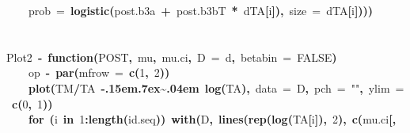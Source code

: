 \documentclass{article}
\makeatletter
\newcommand{\hlnumber}[1]{\textcolor[rgb]{0,0,0}{#1}}%
\newcommand{\hlfunctioncall}[1]{\textcolor[rgb]{.5,0,.33}{\textbf{#1}}}%
\newcommand{\hlstring}[1]{\textcolor[rgb]{.6,.6,1}{#1}}%
\newcommand{\hlkeyword}[1]{\textbf{#1}}%
\newcommand{\hlargument}[1]{\textcolor[rgb]{.69,.25,.02}{#1}}%
\newcommand{\hlformalargs}[1]{\hlargument{#1}}%
\newcommand{\hleqformalargs}[1]{\hlargument{#1}}%
\newcommand{\hlassignement}[1]{\textbf{#1}}%
\newcommand{\hlsymbol}[1]{#1}%
\def\urltilda{\kern -.15em\lower .7ex\hbox{\~{}}\kern .04em}%
\newcommand{\hlstd}[1]{\textcolor[rgb]{0,0,0}{#1}}%
\newenvironment{kframe}{%
 \def\FrameCommand##1{\hskip\@totalleftmargin \hskip-\fboxsep
 \colorbox{shadecolor}{##1}\hskip-\fboxsep
     \hskip-\linewidth \hskip-\@totalleftmargin \hskip\columnwidth}%
 \MakeFramed {\advance\hsize-\width
   \@totalleftmargin\z@ \linewidth\hsize
   \@setminipage}}%
 {\par\unskip\endMakeFramed}
\newenvironment{knitrout}{}{} %
\makeatother
\begin{document}
\begin{knitrout}
{\begin{kframe}
\begin{flushleft}
\hlstd{}{\ }{\ }{\ }{\ }\hlargument{prob}{\ }\hlargument{=}{\ }\hlfunctioncall{logistic}\hlkeyword{(}\hlsymbol{post.b3}\hlkeyword{\usebox{\hlnormalsizeboxdollar}}\hlsymbol{a}{\ }\hlkeyword{+}{\ }\hlsymbol{post.b3}\hlkeyword{\usebox{\hlnormalsizeboxdollar}}\hlsymbol{bT}{\ }\hlkeyword{*}{\ }\hlsymbol{d}\hlkeyword{\usebox{\hlnormalsizeboxdollar}}\hlsymbol{TA}\hlkeyword{[}\hlsymbol{i}\hlkeyword{]}\hlkeyword{)}\hlkeyword{,}{\ }\hlargument{size}{\ }\hlargument{=}{\ }\hlsymbol{d}\hlkeyword{\usebox{\hlnormalsizeboxdollar}}\hlsymbol{TA}\hlkeyword{[}\hlsymbol{i}\hlkeyword{]}\hlkeyword{)}\hlkeyword{)}\hlkeyword{)}\hspace*{\fill}\\
\hlstd{}\hspace*{\fill}\\
\hlstd{}\hspace*{\fill}\\
\hlstd{}\hlsymbol{Plot2}{\ }\hlassignement{\usebox{\hlnormalsizeboxlessthan}-}{\ }\hlkeyword{function}\hlkeyword{(}\hlformalargs{POST}\hlkeyword{,}{\ }\hlformalargs{mu}\hlkeyword{,}{\ }\hlformalargs{mu.ci}\hlkeyword{,}{\ }\hlformalargs{D}{\ }\hleqformalargs{=}{\ }\hlsymbol{d}\hlkeyword{,}{\ }\hlformalargs{betabin}{\ }\hleqformalargs{=}{\ }\hlnumber{FALSE}\hlkeyword{)}{\ }\hlkeyword{\usebox{\hlnormalsizeboxopenbrace}}\hspace*{\fill}\\
\hlstd{}{\ }{\ }{\ }{\ }\hlsymbol{op}{\ }\hlassignement{\usebox{\hlnormalsizeboxlessthan}-}{\ }\hlfunctioncall{par}\hlkeyword{(}\hlargument{mfrow}{\ }\hlargument{=}{\ }\hlfunctioncall{c}\hlkeyword{(}\hlnumber{1}\hlkeyword{,}{\ }\hlnumber{2}\hlkeyword{)}\hlkeyword{)}\hspace*{\fill}\\
\hlstd{}{\ }{\ }{\ }{\ }\hlfunctioncall{plot}\hlkeyword{(}\hlsymbol{TM}\hlkeyword{/}\hlsymbol{TA}{\ }\hlkeyword{\urltilda{}}{\ }\hlfunctioncall{log}\hlkeyword{(}\hlsymbol{TA}\hlkeyword{)}\hlkeyword{,}{\ }\hlargument{data}{\ }\hlargument{=}{\ }\hlsymbol{D}\hlkeyword{,}{\ }\hlargument{pch}{\ }\hlargument{=}{\ }\hlstring{""}\hlkeyword{,}{\ }\hlargument{ylim}{\ }\hlargument{=}{\ }\hlfunctioncall{c}\hlkeyword{(}\hlnumber{0}\hlkeyword{,}{\ }\hlnumber{1}\hlkeyword{)}\hlkeyword{)}\hspace*{\fill}\\
\hlstd{}{\ }{\ }{\ }{\ }\hlkeyword{for}{\ }\hlkeyword{(}\hlsymbol{i}{\ }\hlkeyword{in}{\ }\hlnumber{1}\hlkeyword{:}\hlfunctioncall{length}\hlkeyword{(}\hlsymbol{id.seq}\hlkeyword{)}\hlkeyword{)}{\ }\hlfunctioncall{with}\hlkeyword{(}\hlsymbol{D}\hlkeyword{,}{\ }\hlfunctioncall{lines}\hlkeyword{(}\hlfunctioncall{rep}\hlkeyword{(}\hlfunctioncall{log}\hlkeyword{(}\hlsymbol{TA}\hlkeyword{[}\hlsymbol{i}\hlkeyword{]}\hlkeyword{)}\hlkeyword{,}{\ }\hlnumber{2}\hlkeyword{)}\hlkeyword{,}{\ }\hlfunctioncall{c}\hlkeyword{(}\hlsymbol{mu.ci}\hlkeyword{[}\hlkeyword{,}\hspace*{\fill}\\

\end{flushleft}
\end{kframe}}
\end{knitrout}
\end{document}
